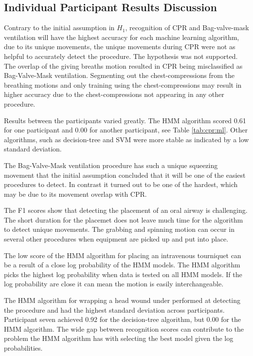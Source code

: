 \subsection{Individual Participant Results Discussion}
\label{sec:Results:Individual:Discussion}
Contrary to the initial assumption in $H_1$, recognition of CPR and Bag-valve-mask ventilation will have the highest accuracy for each machine learning algorithm, due to its unique movements, the unique movements during CPR were not as helpful to accurately detect the procedure. The hypothesis was not supported. The overlap of the giving breaths motion resulted in CPR being misclassified as Bag-Valve-Mask ventilation. Segmenting out the chest-compressions from the breathing motions and only training using the chest-compressions may result in higher accuracy due to the chest-compressions not appearing in any other procedure.
\par Results between the participants varied greatly. The HMM algorithm scored 0.61 for one participant and 0.00 for another participant, see Table \ref{tab:cpr:ml}. Other algorithms, such as decision-tree and SVM were more stable as indicated by a low standard deviation.
\par The Bag-Valve-Mask ventilation procedure has such a unique squeezing movement that the initial assumption concluded that it will be one of the easiest procedures to detect. In contrast it turned out to be one of the hardest, which may be due to its movement overlap with CPR.
\par The F1 scores show that detecting the placement of an oral airway is challenging. The short duration for the placemet does not leave much time for the algorithm to detect unique movements. The grabbing and spinning motion can occur in several other procedures when equipment are picked up and put into place.
\par The low score of the HMM algorithm for placing an intravenous tourniquet can be a result of a close log probability of the HMM models. The HMM algorithm picks the highest log probability when data is tested on all HMM models. If the log probability are close it can mean the motion is easily interchangeable.
\par The HMM algorithm for wrapping a head wound under performed at detecting the procedure and had the highest standard deviation across participants. Participant seven achieved 0.92 for the decision-tree algorithm, but 0.00 for the HMM algorithm. The wide gap between recognition scores can contribute to the problem the HMM algorithm has with selecting the best model given the log probabilities.

